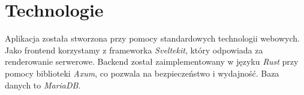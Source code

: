 \documentclass{report}
\begin{document}
\section*{Technologie}
Aplikacja została stworzona przy pomocy standardowych technologii webowych.
Jako frontend korzystamy z frameworka \emph{Sveltekit}, który odpowiada za 
renderowanie serwerowe. Backend został zaimplementowany w języku
\emph{Rust} przy pomocy biblioteki \emph{Axum}, co pozwala na bezpieczeństwo
i wydajność. Baza danych to \emph{MariaDB}.
\end{document}
